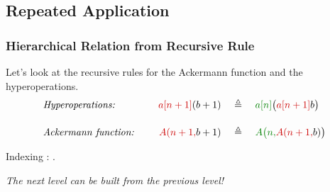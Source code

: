 \subsection{Repeated Application}


\begin{frame}
\frametitle{Hierarchical Relation from Recursive Rule}

Let's look at the recursive rules for the Ackermann function and the hyperoperations.
\begin{equation*}
\begin{array}{lrcl}
\textit{Hyperoperations: } \quad & \textcolor{red}{a[n+1]}(b+1) & ~ \triangleq ~ & \textcolor{green}{a[n]}\big(\textcolor{red}{a[n+1]}b\big)
\\[15pt]
\textit{Ackermann function: } \quad & \textcolor{red}{A(n+1,} b+1) & ~ \triangleq ~ & \textcolor{green}{A\big(n,} \textcolor{red}{A(n+1,} b)\big)
\end{array}
\end{equation*}

\pause
Indexing : .

\bigskip

\pause
\emph{The next level can be built from the previous level!}

\end{frame}


